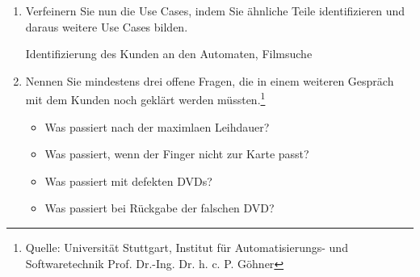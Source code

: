 \documentclass{lehramt-informatik}
\begin{document}
\begin{enumerate}

\item Verfeinern Sie nun die Use Cases, indem Sie ähnliche Teile
identifizieren und daraus weitere Use Cases bilden.

\begin{antwort}
Identifizierung des Kunden an den Automaten, Filmsuche
\end{antwort}


\item Nennen Sie mindestens drei offene Fragen, die in einem weiteren
Gespräch mit dem Kunden noch geklärt werden müssten.\footnote{Quelle:
Universität Stuttgart, Institut für Automatisierungs- und
Softwaretechnik Prof. Dr.-Ing. Dr. h. c. P. Göhner}

\begin{antwort}
\begin{itemize}
\item Was passiert nach der maximlaen Leihdauer?
\item Was passiert, wenn der Finger nicht zur Karte passt?
\item Was passiert mit defekten DVDs?
\item Was passiert bei Rückgabe der falschen DVD?
\end{itemize}
\end{antwort}
\end{enumerate}

\literatur
\end{document}
